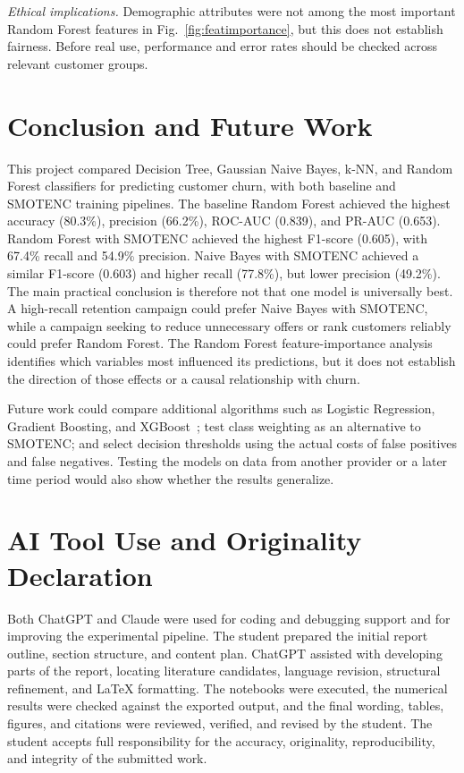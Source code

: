 \documentclass[conference]{IEEEtran}
\begin{document}
	\textit{Ethical implications.} Demographic attributes were not among the most important Random Forest features in Fig.~\ref{fig:featimportance}, but this does not establish fairness. Before real use, performance and error rates should be checked across relevant customer groups.
	
	\section{Conclusion and Future Work}
	\label{sec:conclusion}
	
	This project compared Decision Tree, Gaussian Naive Bayes, k-NN, and Random Forest classifiers for predicting customer churn, with both baseline and SMOTENC training pipelines. The baseline Random Forest achieved the highest accuracy (80.3\%), precision (66.2\%), ROC-AUC (0.839), and PR-AUC (0.653). Random Forest with SMOTENC achieved the highest F1-score (0.605), with 67.4\% recall and 54.9\% precision. Naive Bayes with SMOTENC achieved a similar F1-score (0.603) and higher recall (77.8\%), but lower precision (49.2\%). The main practical conclusion is therefore not that one model is universally best. A high-recall retention campaign could prefer Naive Bayes with SMOTENC, while a campaign seeking to reduce unnecessary offers or rank customers reliably could prefer Random Forest. The Random Forest feature-importance analysis identifies which variables most influenced its predictions, but it does not establish the direction of those effects or a causal relationship with churn.
	
	Future work could compare additional algorithms such as Logistic Regression, Gradient Boosting, and XGBoost~\cite{b1}; test class weighting as an alternative to SMOTENC; and select decision thresholds using the actual costs of false positives and false negatives. Testing the models on data from another provider or a later time period would also show whether the results generalize.
	
	\section*{AI Tool Use and Originality Declaration}
	\label{sec:ai_declaration}
	
	Both ChatGPT and Claude were used for coding and debugging support and for improving the experimental pipeline. The student prepared the initial report outline, section structure, and content plan. ChatGPT assisted with developing parts of the report, locating literature candidates, language revision, structural refinement, and LaTeX formatting. The notebooks were executed, the numerical results were checked against the exported output, and the final wording, tables, figures, and citations were reviewed, verified, and revised by the student. The student accepts full responsibility for the accuracy, originality, reproducibility, and integrity of the submitted work.
	
\end{document}
